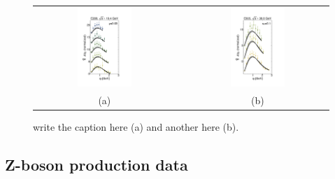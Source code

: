 \documentclass[aps,preprintnumbers,showpacs,nofootinbib,superscriptaddress,floatfix]{revtex4}
\begin{document}
\begin{figure}[h!]
\centering
\begin{tabular}{ccc}
\includegraphics[width=0.40\textwidth]{plots/DY-Z/DY_SCIplot_flINDEP_3.pdf}
&\hspace{0.001cm}
&
\includegraphics[width=0.40\textwidth]{plots/DY-Z/DY_SCIplot_flINDEP_4.pdf}
\\
(a) && (b)
\end{tabular}
\caption{write the caption here (a) and another here (b).}
\label{f:DY_panel_2}
\end{figure}



\subsection{Z-boson production data}
\label{ss:zboson}
\end{document}

